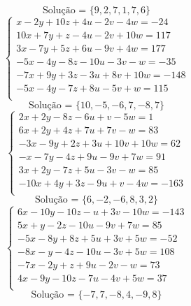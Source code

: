\documentclass[12pt,oneside,a4paper]{article}
\begin{document}
\begin{equation*}
\text{Solução = }\{9,2,7,1,7,6\}
\end{equation*}
\vspace{\baselineskip}
\begin{equation*}
\begin{cases}
x-2y+10z+4u-2v-4w=-24 \\
10x+7y+z-4u-2v+10w=117 \\
3x-7y+5z+6u-9v+4w=177 \\
-5x-4y-8z-10u-3v-w=-35 \\
-7x+9y+3z-3u+8v+10w=-148 \\
-5x-4y-7z+8u-5v+w=115 \\
\end{cases}
\end{equation*}
\begin{equation*}
\text{Solução = }\{10,-5,-6,7,-8,7\}
\end{equation*}
\vspace{\baselineskip}
\begin{equation*}
\begin{cases}
2x+2y-8z-6u+v-5w=1 \\
6x+2y+4z+7u+7v-w=83 \\
-3x-9y+2z+3u+10v+10w=62 \\
-x-7y-4z+9u-9v+7w=91 \\
3x+2y-7z+5u-3v-w=85 \\
-10x+4y+3z-9u+v-4w=-163 \\
\end{cases}
\end{equation*}
\begin{equation*}
\text{Solução = }\{6,-2,-6,8,3,2\}
\end{equation*}
\vspace{\baselineskip}
\begin{equation*}
\begin{cases}
6x-10y-10z-u+3v-10w=-143 \\
5x+y-2z-10u-9v+7w=85 \\
-5x-8y+8z+5u+3v+5w=-52 \\
-8x-y-4z-10u-3v+5w=108 \\
-7x-2y+z+9u-2v-w=73 \\
4x-9y-10z-7u-4v+5w=37 \\
\end{cases}
\end{equation*}
\begin{equation*}
\text{Solução = }\{-7,7,-8,4,-9,8\}
\end{equation*}
\end{document}
